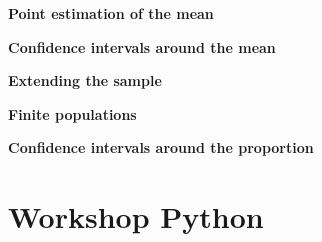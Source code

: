 \begin{exercise}
\label{ex:point_estimation_of_the_mean}

\textbf{Point estimation of the mean}




\end{exercise}

\begin{exercise}
\label{ex:confidence_intervals_around_the_mean}

\textbf{Confidence intervals around the mean}








\end{exercise}

\begin{exercise}
\label{ex:extending_the_sample}

\textbf{Extending the sample}




\end{exercise}

\begin{exercise}
\label{ex:finite_populations}

\textbf{Finite populations}




\end{exercise}

\begin{exercise}
\label{ex:confidence_intervals_around_the_proportion}

\textbf{Confidence intervals around the proportion}




\end{exercise}


\section{Workshop Python} %
\label{sec:workshop03_python}


